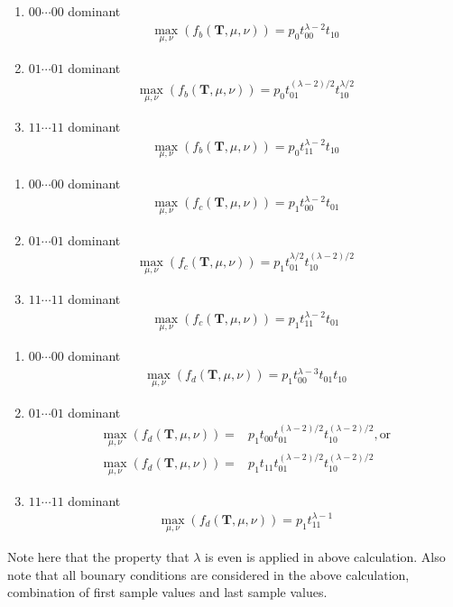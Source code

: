 ﻿\documentclass[a4paper,xelatex,english]{bxjsarticle}
\newcommand\mib[1]{\boldsymbol{#1}}
\begin{document}
\begin{enumerate}[{b)}-i)]
	\item $00 \cdots 00$ dominant 
	\begin{align}
	\max_{\mu, \nu}(f_{b}(\mib{T}, \mu, \nu)) = p_{0} t_{00}^{\lambda - 2} t_{10}
	 \label{expression:nonneg1}
	\end{align}
	\item $01 \cdots 01$ dominant 
	\begin{align}
	\max_{\mu, \nu}(f_{b}(\mib{T}, \mu, \nu)) = p_{0} t_{01}^{(\lambda - 2) / 2} t_{10}^{\lambda / 2}
	\end{align}
	\item $11 \cdots 11$ dominant 
	\begin{align}
	\max_{\mu, \nu}(f_{b}(\mib{T}, \mu, \nu)) = p_{0} t_{11}^{\lambda - 2} t_{10} \label{expression:neg2}
	\end{align}
\end{enumerate}

\begin{enumerate}[{c)}-i)]
	\item $00 \cdots 00$ dominant 
	\begin{align}
	\max_{\mu, \nu}(f_{c}(\mib{T}, \mu, \nu)) = p_{1} t_{00}^{\lambda - 2} t_{01} \label{expression:neg3}
	\end{align}
	\item $01 \cdots 01$ dominant 
	\begin{align}
	\max_{\mu, \nu}(f_{c}(\mib{T}, \mu, \nu)) = p_{1} t_{01}^{\lambda / 2} t_{10}^{(\lambda - 2) / 2}
	\end{align}
	\item $11 \cdots 11$ dominant 
	\begin{align}
	\max_{\mu, \nu}(f_{c}(\mib{T}, \mu, \nu)) = p_{1} t_{11}^{\lambda - 2} t_{01}
	\end{align}
\end{enumerate}

\begin{enumerate}[{d)}-i)]
	\item $00 \cdots 00$ dominant 
	\begin{align}
	\max_{\mu, \nu}(f_{d}(\mib{T}, \mu, \nu)) = p_{1} t_{00}^{\lambda - 3} t_{01} t_{10} \label{expression:neg4}
	\end{align}
	\item $01 \cdots 01$ dominant 
	\begin{align}
	\max_{\mu, \nu}(f_{d}(\mib{T}, \mu, \nu)) = & p_{1} t_{00} t_{01}^{(\lambda - 2) / 2} t_{10}^{(\lambda - 2) / 2}, {\textrm{or}} \\
	\max_{\mu, \nu}(f_{d}(\mib{T}, \mu, \nu)) = & p_{1} t_{11} t_{01}^{(\lambda - 2) / 2} t_{10}^{(\lambda - 2) / 2}
	\end{align}
	\item $11 \cdots 11$ dominant 
	\begin{align}
	\max_{\mu, \nu}(f_{d}(\mib{T}, \mu, \nu)) = p_{1} t_{11}^{\lambda - 1}
	\end{align}
\end{enumerate}
Note here that the property that $\lambda$ is even is applied in above calculation.
Also note that all bounary conditions are considered in the above calculation, combination of first sample values and last sample values.
\end{document}
